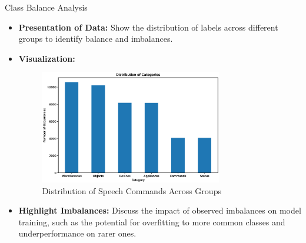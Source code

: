 \documentclass{beamer}
\begin{document}
\begin{frame}{Class Balance Analysis}
  \begin{itemize}
    \item \textbf{Presentation of Data:} Show the distribution of labels across different groups to identify balance and imbalances.
    \item \textbf{Visualization:}
      \begin{figure}
        \centering
        \includegraphics[width=0.75\textwidth]{fig/categories_dist} %
        \caption{Distribution of Speech Commands Across Groups}
        \label{fig:class_balance}
      \end{figure}
    \item \textbf{Highlight Imbalances:} Discuss the impact of observed imbalances on model training, such as the potential for overfitting to more common classes and underperformance on rarer ones.
  \end{itemize}
\end{frame}
\end{document}
